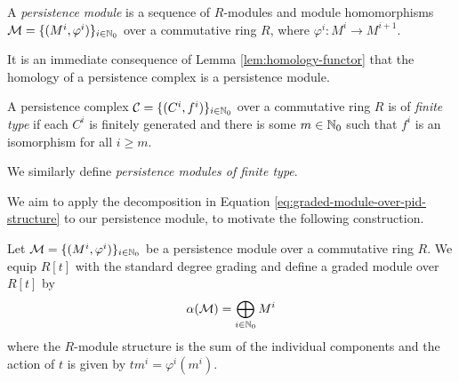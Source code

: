 \begin{definition} \label{def:persistence-module}
    A \emph{persistence module} is a sequence of $R$-modules and module homomorphisms $\mathcal M = \{(M^i, \varphi^i)\}_{i \in \mathbb N_0}$ over a commutative ring $R$, where $\varphi^i: M^i \to M^{i+1}$.
\end{definition}

It is an immediate consequence of Lemma \ref{lem:homology-functor} that the homology of a persistence complex is a persistence module.



\begin{definition} \label{def:finite-type-persistence-complex}
    A persistence complex $\mathcal C = \{(C^i, f^i)\}_{i \in \mathbb N_0}$ over a commutative ring $R$ is of \emph{finite type} if each $C^i$ is finitely generated and there is some $m \in \mathbb N_0$ such that $f^i$ is an isomorphism for all $i \geq m$.
\end{definition}

We similarly define \emph{persistence modules of finite type}.

We aim to apply the decomposition in Equation \ref{eq:graded-module-over-pid-structure} to our persistence module, to motivate the following construction.

\begin{definition}
    Let $\mathcal M = \{(M^i, \varphi^i)\}_{i \in \mathbb N_0}$ be a persistence module over a commutative ring $R$. We equip $R[t]$ with the standard degree grading and define a graded module over $R[t]$ by
    \[ \alpha(\mathcal M) = \bigoplus_{i\in\mathbb N_0} M^i \]
    where the $R$-module structure is the sum of the individual components and the action of $t$ is given by $tm^i = \varphi^i(m^i)$.
\end{definition}

